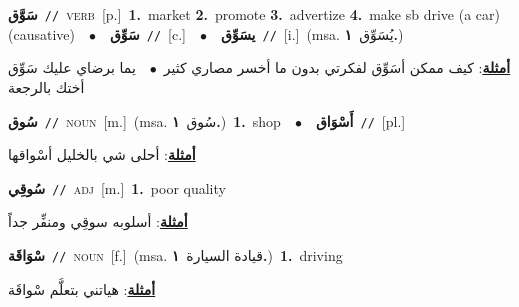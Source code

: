 \documentclass[10pt,a4paper,twoside]{article} %
\begin{document}
\begin{multicols}{2}
{\setlength\topsep{0pt}\textbf{\foreignlanguage{arabic}{سَوَّق}}\ {\color{gray}\texttt{//}\color{black}}\ \textsc{verb}\ [p.]\ \textbf{1.}~market  \textbf{2.}~promote  \textbf{3.}~advertize  \textbf{4.}~make sb drive (a car) (causative)\ \ $\bullet$\ \ \setlength\topsep{0pt}\textbf{\foreignlanguage{arabic}{سَوِّق}}\ {\color{gray}\texttt{//}\color{black}}\ [c.]\ \ $\bullet$\ \ \setlength\topsep{0pt}\textbf{\foreignlanguage{arabic}{يسَوِّق}}\ {\color{gray}\texttt{//}\color{black}}\ [i.]\ \color{gray}(msa. \foreignlanguage{arabic}{يُسَوِّق}~\foreignlanguage{arabic}{\textbf{١.}})\color{black}\  \begin{flushright}\color{gray}\foreignlanguage{arabic}{\textbf{\underline{\foreignlanguage{arabic}{أمثلة}}}: كيف ممكن أسَوِّق لفكرتي بدون ما أخسر مصاري كثير\ $\bullet$\ \  يما برضاي عليك سَوِّق أختك بالرجعة}\end{flushright}\color{black}} \vspace{2mm}

{\setlength\topsep{0pt}\textbf{\foreignlanguage{arabic}{سُوق}}\ {\color{gray}\texttt{//}\color{black}}\ \textsc{noun}\ [m.]\ \color{gray}(msa. \foreignlanguage{arabic}{سُوق}~\foreignlanguage{arabic}{\textbf{١.}})\color{black}\ \textbf{1.}~shop\ \ $\bullet$\ \ \setlength\topsep{0pt}\textbf{\foreignlanguage{arabic}{أَسْوَاق}}\ {\color{gray}\texttt{//}\color{black}}\ [pl.]\  \begin{flushright}\color{gray}\foreignlanguage{arabic}{\textbf{\underline{\foreignlanguage{arabic}{أمثلة}}}: أحلى شي بالخليل أسْواقها}\end{flushright}\color{black}} \vspace{2mm}

{\setlength\topsep{0pt}\textbf{\foreignlanguage{arabic}{سُوقِي}}\ {\color{gray}\texttt{//}\color{black}}\ \textsc{adj}\ [m.]\ \textbf{1.}~poor quality\  \begin{flushright}\color{gray}\foreignlanguage{arabic}{\textbf{\underline{\foreignlanguage{arabic}{أمثلة}}}: أسلوبه سوقِي ومنفِّر جداً}\end{flushright}\color{black}} \vspace{2mm}

{\setlength\topsep{0pt}\textbf{\foreignlanguage{arabic}{سْوَاقَة}}\ {\color{gray}\texttt{//}\color{black}}\ \textsc{noun}\ [f.]\ \color{gray}(msa. \foreignlanguage{arabic}{قيادة السيارة}~\foreignlanguage{arabic}{\textbf{١.}})\color{black}\ \textbf{1.}~driving\  \begin{flushright}\color{gray}\foreignlanguage{arabic}{\textbf{\underline{\foreignlanguage{arabic}{أمثلة}}}: هياتني بتعلَّم سْواقَة}\end{flushright}\color{black}} \vspace{2mm}


\end{multicols}
\end{document}

